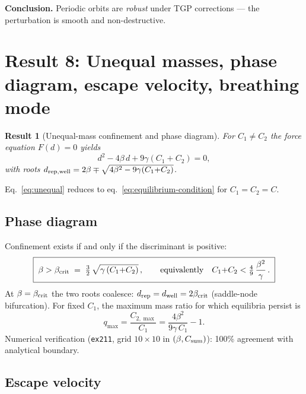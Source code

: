 \documentclass[11pt,a4paper]{article}
\newcommand{\drep}{d_{\rm rep}}
\newcommand{\dwell}{d_{\rm well}}
\newtheorem{result}{Result}
\begin{document}
\noindent\textbf{Conclusion.}  Periodic orbits are \emph{robust} under TGP
corrections --- the perturbation is smooth and non-destructive.

\section{Result 8: Unequal masses, phase diagram, escape velocity, breathing mode}
\label{sec:unequal}

\begin{result}[Unequal-mass confinement and phase diagram]
For $C_1\neq C_2$ the force equation $F(d)=0$ yields
\begin{equation}\label{eq:unequal}
  d^{2} - 4\beta\,d + 9\gamma(C_1{+}C_2) = 0,
\end{equation}
with roots $d_{\rm rep,well} = 2\beta \mp \sqrt{4\beta^{2}-9\gamma(C_1{+}C_2)}$.
\end{result}

\noindent Eq.~\eqref{eq:unequal} reduces to eq.~\eqref{eq:equilibrium-condition}
for $C_1{=}C_2{=}C$.

\subsection{Phase diagram}

Confinement exists if and only if the discriminant is positive:
\begin{equation}\label{eq:phase}
\boxed{\;
  \beta > \beta_{\rm crit} \;=\; \tfrac{3}{2}\,\sqrt{\gamma\,(C_1{+}C_2)}\,,
  \qquad\text{equivalently}\quad
  C_1{+}C_2 < \tfrac{4}{9}\,\frac{\beta^{2}}{\gamma}\,.
\;}
\end{equation}
At $\beta=\beta_{\rm crit}$ the two roots coalesce:
$\drep = \dwell = 2\beta_{\rm crit}$ (saddle-node bifurcation).
For fixed $C_1$, the maximum mass ratio for which equilibria persist is
\begin{equation}
  q_{\max} = \frac{C_{2,\max}}{C_1}
  = \frac{4\beta^{2}}{9\gamma\,C_1} - 1.
\end{equation}
Numerical verification (\texttt{ex211}, grid $10\times10$ in
$(\beta, C_{\rm sum})$): 100\% agreement with analytical boundary.

\subsection{Escape velocity}
\end{document}
